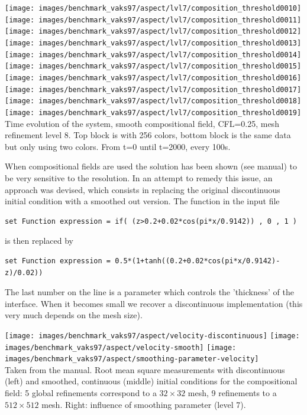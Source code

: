 \begin{itemize}
\begin{center}
\texttt{[image: images/benchmark\_vaks97/aspect/lvl7/composition\_threshold0010]}
\texttt{[image: images/benchmark\_vaks97/aspect/lvl7/composition\_threshold0011]}
\texttt{[image: images/benchmark\_vaks97/aspect/lvl7/composition\_threshold0012]}
\texttt{[image: images/benchmark\_vaks97/aspect/lvl7/composition\_threshold0013]}
\texttt{[image: images/benchmark\_vaks97/aspect/lvl7/composition\_threshold0014]}\\
\texttt{[image: images/benchmark\_vaks97/aspect/lvl7/composition\_threshold0015]}
\texttt{[image: images/benchmark\_vaks97/aspect/lvl7/composition\_threshold0016]}
\texttt{[image: images/benchmark\_vaks97/aspect/lvl7/composition\_threshold0017]}
\texttt{[image: images/benchmark\_vaks97/aspect/lvl7/composition\_threshold0018]}
\texttt{[image: images/benchmark\_vaks97/aspect/lvl7/composition\_threshold0019]}\\
{\captionfont Time evolution of the system, smooth compositional field, CFL=0.25, 
mesh refinement level 8. Top block is with 256 colors, bottom block is the same data 
but only using two colors. From t=0 until t=2000, every 100s.}
\end{center}

When compositional fields are used the solution has been shown (see \aspect manual)
to be very sensitive to the resolution. In an attempt to remedy this issue, 
an approach was devised, which consists in replacing the original discontinuous initial 
condition with a smoothed out version. The function in the input file 
\begin{lstlisting}
set Function expression = if( (z>0.2+0.02*cos(pi*x/0.9142)) , 0 , 1 )
\end{lstlisting}
is then replaced by 
\begin{lstlisting}
set Function expression = 0.5*(1+tanh((0.2+0.02*cos(pi*x/0.9142)-z)/0.02))
\end{lstlisting}
The last number on the line is a parameter which controls the 'thickness' of the interface.
When it becomes small we recover a discontinuous implementation (this very much 
depends on the mesh size). 


\begin{center}
\texttt{[image: images/benchmark\_vaks97/aspect/velocity-discontinuous]}
\texttt{[image: images/benchmark\_vaks97/aspect/velocity-smooth]}
\texttt{[image: images/benchmark\_vaks97/aspect/smoothing-parameter-velocity]}\\
{\captionfont Taken from the \aspect manual. 
Root mean square measurements with discontinuous (left) and smoothed, continuous 
(middle) initial conditions for the compositional field: 5 global refinements correspond to 
a $32\times 32$ mesh, 9 refinements to a $512 \times 512$ mesh.
Right: influence of smoothing parameter (level 7).}
\end{center}



\end{itemize}
